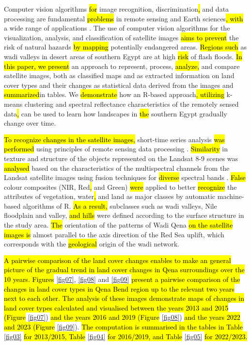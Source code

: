 \documentclass[information,article,submit,pdftex,moreauthors]{Definitions/mdpi}
\begin{document}
Computer vision algorithms \hl{for }image recognition, discrimination\hl{, }and data processing are fundamental \hl{problems }in remote sensing and Earth sciences\hl{, with }a wide range of applications 
\cite{ABDELKAREEM2015245,Lemenkova202231,ELQADI2020104696,Husseinetal1995,DHANYA2022211}. The use of computer vision algorithms for the visualization, analysis, and classification of satellite images \hl{aims to prevent }the risk of natural hazards \hl{by mapping }potentially endangered areas. \hl{Regions such }as wadi valleys in desert areas of southern Egypt are at high \hl{risk }of flash floods. \hl{In this paper, we present }an approach to represent, process, \hl{analyze, }and compare satellite images, both as classified maps and as extracted information on land cover types and their changes as statistical data derived from the images and \hl{summarized}in tables. We \hl{demonstrate }how an R-based approach\hl{, utilizing }k-means clustering and spectral reflectance characteristics of the remotely sensed data\hl{, }can be used to learn how landscapes in \hl{the }southern Egypt gradually change over time.

\hl{To recognize changes in the satellite images, }short-time series analysis \hl{was performed }using principles of remote sensing data processing \cite{curran1985principles}. \hl{Similarity }in texture and structure of the objects represented on the Landsat 8-9 scenes was \hl{analysed }based on the characteristics of the multispectral channels from the Landsat satellite images using fusion techniques for \hl{diverse }spectral bands \cite{4234117}. \hl{False }colour composites (NIR, Red\hl{, }and Green) \hl{were }applied to better \hl{recognize } the attributes of vegetation, water\hl{, }and land as major classes by automatic machine-based algorithms of R. \hl{As a result, } subclasses such as wadi valleys, Nile floodplain and valley, \hl{and hills }were defined according to the surface structure in the study area. \hl{The } orientation of the patterns of Wadi Qena \hl{on the satellite images is }almost parallel to the axis direction of the Red Sea uplift, which corresponds with the \hl{geological} origin of the wadi network.

\hl{A pairwise comparison of the land cover changes enables to make an  general picture of the gradual trend in land cover changes in Qena surroundings over the 10 years. Figures} \ref{fig07}, \ref{fig08} and \ref{fig09} \hl{present a pairwise comparison of the changes in land cover types in Qena Bend region up to the relevant two years next to each other. The analysis of these images demonstrate maps of changes in land cover types calculated and visualised between the years 2013 and 2015 (Figure} \ref{fig07}) \hl{and the years 2016 and 2019 (Figure} \ref{fig08}) \hl{and the years 2022 and 2023 (Figure} \ref{fig09}). \hl{The computation is summarised in the tables in Table} \ref{fig03} \hl{for 2013/2015, Table} \ref{fig04} \hl{for 2016/2019, and Table} \ref{fig05} \hl{for 2022/2023.} 
\end{document}
